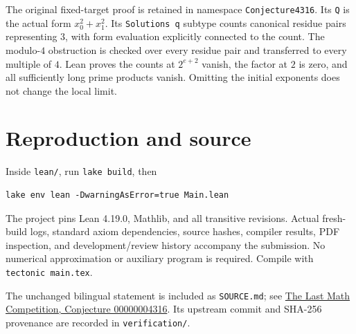 \documentclass[11pt]{article}
\begin{document}
The original fixed-target proof is retained in namespace \texttt{Conjecture4316}. Its \texttt{Q} is the actual form $x_0^2+x_1^2$. Its \texttt{Solutions q} subtype counts canonical residue pairs representing $3$, with form evaluation explicitly connected to the count. The modulo-$4$ obstruction is checked over every residue pair and transferred to every multiple of $4$. Lean proves the counts at $2^{e+2}$ vanish, the factor at $2$ is zero, and all sufficiently long prime products vanish. Omitting the initial exponents does not change the local limit.

\section*{Reproduction and source}
Inside \texttt{lean/}, run \texttt{lake build}, then
\begin{verbatim}
lake env lean -DwarningAsError=true Main.lean
\end{verbatim}
The project pins Lean 4.19.0, Mathlib, and all transitive revisions. Actual fresh-build logs, standard axiom dependencies, source hashes, compiler results, PDF inspection, and development/review history accompany the submission. No numerical approximation or auxiliary program is required. Compile with \texttt{tectonic main.tex}.

The unchanged bilingual statement is included as \texttt{SOURCE.md}; see \href{https://github.com/The-Last-Math-Competition/The-Last-Math-Competition/blob/main/conjectures/00000004316.md}{The Last Math Competition, Conjecture 00000004316}. Its upstream commit and SHA-256 provenance are recorded in \texttt{verification/}.
\end{document}
